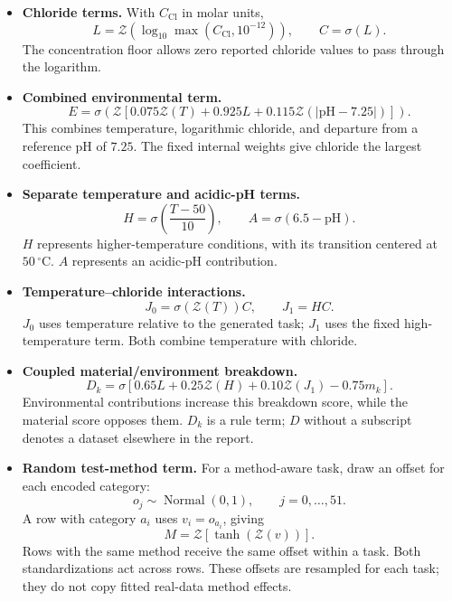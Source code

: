 \documentclass[11pt]{article}
\newenvironment{notes}
  {\begin{itemize}\setlength{\itemsep}{0.45em}\setlength{\parsep}{0pt}}
  {\end{itemize}}
\begin{document}
\begin{notes}
    \item \textbf{Chloride terms.}
    With \(C_{\mathrm{Cl}}\) in molar units,
    \[
        L=\mathcal{Z}\!\left(
            \log_{10}\max(C_{\mathrm{Cl}},10^{-12})
        \right),
        \qquad C=\sigma(L).
    \]
    The concentration floor allows zero reported chloride
    values to pass through the logarithm.

    \item \textbf{Combined environmental term.}
    \begin{equation}
        E=\sigma\!\left(
            \mathcal{Z}\!\left[
                0.075\mathcal{Z}(T)+0.925L
                +0.115\mathcal{Z}(|\mathrm{pH}-7.25|)
            \right]
        \right).
        \label{eq:rule-combined-environment}
    \end{equation}
    This combines temperature, logarithmic chloride, and
    departure from a reference pH of \(7.25\). The fixed
    internal weights give chloride the largest coefficient.

    \item \textbf{Separate temperature and acidic-pH terms.}
    \[
        H=\sigma\!\left(\frac{T-50}{10}\right),
        \qquad A=\sigma(6.5-\mathrm{pH}).
    \]
    \(H\) represents higher-temperature conditions, with its
    transition centered at \(50\,^{\circ}\mathrm{C}\).
    \(A\) represents an acidic-pH contribution.

    \item \textbf{Temperature--chloride interactions.}
    \[
        J_0=\sigma(\mathcal{Z}(T))C,
        \qquad
        J_1=HC.
    \]
    \(J_0\) uses temperature relative to the generated task;
    \(J_1\) uses the fixed high-temperature term.
    Both combine temperature with chloride.

    \item \textbf{Coupled material/environment breakdown.}
    \begin{equation}
        D_k=\sigma\!\left[
            0.65L+0.25\mathcal{Z}(H)
            +0.10\mathcal{Z}(J_1)-0.75m_k
        \right].
        \label{eq:rule-coupled-breakdown}
    \end{equation}
    Environmental contributions increase this breakdown
    score, while the material score opposes them.
    \(D_k\) is a rule term; \(D\) without a subscript denotes
    a dataset elsewhere in the report.

    \item \textbf{Random test-method term.}
    For a method-aware task, draw an offset for each encoded
    category:
    \[
        o_j\sim\operatorname{Normal}(0,1),
        \qquad j=0,\ldots,51.
    \]
    A row with category \(a_i\) uses \(v_i=o_{a_i}\), giving
    \begin{equation}
        M=\mathcal{Z}\!\left[\tanh\!\left(\mathcal{Z}(v)\right)\right].
        \label{eq:rule-method-term}
    \end{equation}
    Rows with the same method receive the same offset within
    a task. Both standardizations act across rows.
    These offsets are resampled for each task; they do not
    copy fitted real-data method effects.


\end{notes}
\end{document}
